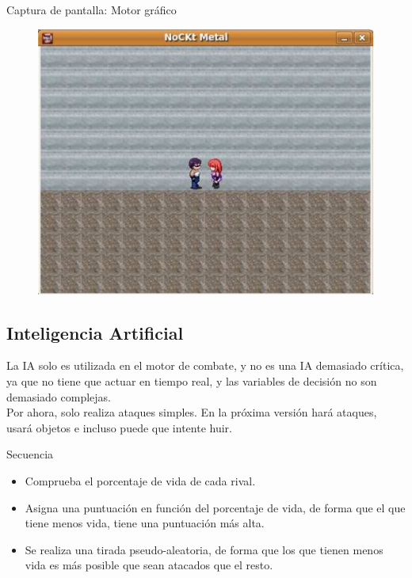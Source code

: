 \documentclass[9pt,xcolor=svgnames]{beamer}
\begin{document}
   \begin{frame}{Captura de pantalla: Motor gráfico}
   \begin{figure}[t]
    \includegraphics[scale=0.35]{./Imagenes/movimiento.pdf}
   \end{figure}    
   \end{frame}

   \subsection{Inteligencia Artificial}
   \begin{frame}
     La IA solo es utilizada en el motor de combate, y no es una IA
     demasiado crítica, ya que no tiene que actuar en tiempo real, y
     las variables de decisión no son demasiado complejas.\\

     Por ahora, solo realiza ataques simples. En la próxima versión hará
     ataques, usará objetos e incluso puede que intente huir.\\

     \begin{block}{Secuencia}
       \begin{itemize}
       \item Comprueba el porcentaje de vida de cada rival.
       \item Asigna una puntuación en función del porcentaje de vida,
         de forma que el que tiene menos vida, tiene una puntuación más alta.
       \item Se realiza una tirada pseudo-aleatoria, de forma que los
         que tienen menos vida es más posible que sean atacados que el resto.
       \end{itemize}
     \end{block}
   \end{frame}
   
\end{document}
